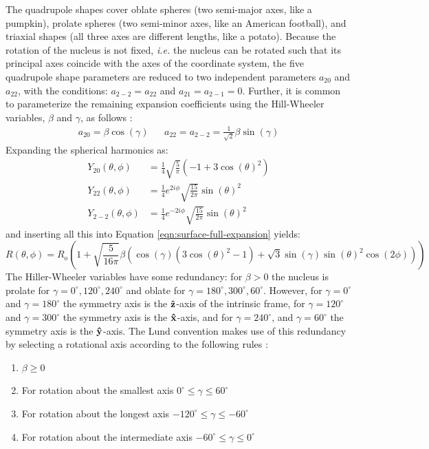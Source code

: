 The quadrupole shapes cover oblate spheres (two semi-major axes, like a pumpkin), prolate spheres (two semi-minor axes, like an American football), and triaxial shapes (all three axes are different lengths, like a potato). Because the rotation of the nucleus is not fixed, \emph{i.e.} the nucleus can be rotated such that its principal axes coincide with the axes of the coordinate system, the five quadrupole shape parameters are reduced to two independent parameters $a_{2 0}$ and $a_{2 2}$, with the conditions: $a_{2 -2}=a_{2 2}$ and $a_{2 1}=a_{2 -1}=0$. Further, it is common to parameterize the remaining expansion coefficients using the Hill-Wheeler variables, $\beta$ and $\gamma$, as follows \cite{wongBook}:
\begin{align}
\label{eqn:chp2-hill-wheeler}
a_{2 0} = \beta \cos(\gamma)  & &  a_{2 2} = a_{2 -2} = \frac{1}{\sqrt{2}}\beta \sin(\gamma)
\end{align}
Expanding the spherical harmonics as:
\begin{align}
\label{eqn:spherical-harmonics}
Y_{2 0}(\theta, \phi) &= \frac{1}{4} \sqrt{\frac{5}{\pi }} \left(-1+3 \cos(\theta )^2\right)\\
Y_{2 2}(\theta, \phi) &= \frac{1}{4} e^{2 i \phi } \sqrt{\frac{15}{2 \pi }} \sin(\theta)^2\\
Y_{2 -2}(\theta, \phi) &= \frac{1}{4} e^{-2 i \phi } \sqrt{\frac{15}{2 \pi }} \sin(\theta)^2
\end{align} 
and inserting all this into Equation \ref{eqn:surface-full-expansion} yields:
\begin{equation}
\label{eqn:quadrupole-surface}
R(\theta, \phi) = R_{o}\left(1+\sqrt{\frac{5}{16 \pi }}\beta  \left(\cos(\gamma ) \left(3 \cos(\theta )^2-1\right)+\sqrt{3} \sin(\gamma ) \sin(\theta )^2\cos(2 \phi )\right)\right)
\end{equation} 
The Hiller-Wheeler variables have some redundancy: for $\beta>0$ the nucleus is prolate for $\gamma=0^{\circ},120^{\circ},240^{\circ}$ and oblate for $\gamma=180^{\circ},300^{\circ},60^{\circ}$. However, for $\gamma=0^{\circ}$ and $\gamma=180^{\circ}$ the symmetry axis is the $\boldsymbol{\hat{\textbf{z}}}$-axis of the intrinsic frame, for $\gamma=120^{\circ}$ and $\gamma=300^{\circ}$ the symmetry axis is the $\boldsymbol{\hat{\textbf{x}}}$-axis, and for $\gamma=240^{\circ}$, and $\gamma=60^{\circ}$ the symmetry axis is the $\boldsymbol{\hat{\textbf{y}}}$-axis. The Lund convention makes use of this redundancy by selecting a rotational axis according to the following rules \cite{wongBook}:
\begin{enumerate}
\item $\beta\geq0$
\item For rotation about the smallest axis $0^{\circ}\leq\gamma\leq60^{\circ}$
\item For rotation about the longest axis $-120^{\circ}\leq\gamma\leq-60^{\circ}$
\item For rotation about the intermediate axis $-60^{\circ}\leq\gamma\leq0^{\circ}$
\end{enumerate}
